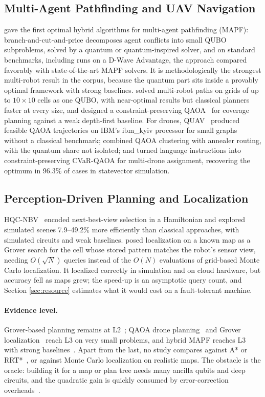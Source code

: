 \documentclass[acmsmall,screen,review]{acmart}
\begin{document}
\subsection{Multi-Agent Pathfinding and UAV Navigation}\label{sec:search-mapf}
\citet{Gerlach2025} gave the first optimal hybrid algorithms for multi-agent pathfinding (MAPF): branch-and-cut-and-price decomposes agent conflicts into small QUBO subproblems, solved by a quantum or quantum-inspired solver, and on standard benchmarks, including runs on a D-Wave Advantage, the approach compared favorably with state-of-the-art MAPF solvers. It is methodologically the strongest multi-robot result in the corpus, because the quantum part sits inside a provably optimal framework with strong baselines. \citet{GonzalezVillasmil2026} solved multi-robot paths on grids of up to $10\times 10$ cells as one QUBO, with near-optimal results but classical planners faster at every size, and \citet{Rao2024} designed a constraint-preserving QAOA~\cite{Hadfield2019} for coverage planning against a weak depth-first baseline. For drones, QUAV~\cite{Innan2025} produced feasible QAOA trajectories on IBM's ibm\_kyiv processor for small graphs without a classical benchmark; \citet{OsabaDrone2025} combined QAOA clustering with annealer routing, with the quantum share not isolated; and \citet{Bang2026} turned language instructions into constraint-preserving CVaR-QAOA for multi-drone assignment, recovering the optimum in 96.3\% of cases in statevector simulation.

\subsection{Perception-Driven Planning and Localization}\label{sec:search-loc}
HQC-NBV~\cite{Yu2025} encoded next-best-view selection in a Hamiltonian and explored simulated scenes 7.9--49.2\% more efficiently than classical approaches, with simulated circuits and weak baselines. \citet{Antero2025} posed localization on a known map as a Grover search for the cell whose stored pattern matches the robot's sensor view, needing $O(\sqrt{N})$ queries instead of the $O(N)$ evaluations of grid-based Monte Carlo localization. It localized correctly in simulation and on cloud hardware, but accuracy fell as maps grew; the speed-up is an asymptotic query count, and Section \ref{sec:resource} estimates what it would cost on a fault-tolerant machine.

\paragraph{Evidence level.} Grover-based planning remains at L2~\cite{Chella2022,Nigatu2025}; QAOA drone planning~\cite{Innan2025} and Grover localization~\cite{Antero2025} reach L3 on very small problems, and hybrid MAPF reaches L3 with strong baselines~\cite{Gerlach2025}. Apart from the last, no study compares against A* or RRT*~\cite{Karaman2011}, or against Monte Carlo localization on realistic maps. The obstacle is the oracle: building it for a map or plan tree needs many ancilla qubits and deep circuits, and the quadratic gain is quickly consumed by error-correction overheads~\cite{Fowler2012}.
\end{document}
